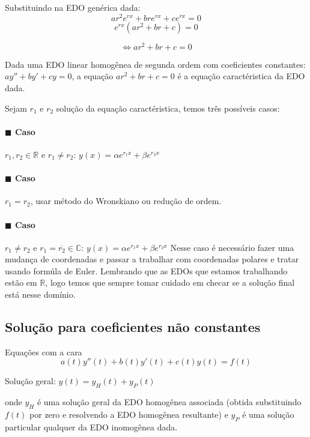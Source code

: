Substituindo na EDO genérica dada:
\[ a r^2 e^{rx} + b r e^{rx} + c e^{rx} = 0  \]
\[ e^{rx} \left( a r^2 + b r + c \right) = 0 \]

\[ \Leftrightarrow ar^2 + br + c = 0 \]


\begin{theorem}
  Dada uma EDO linear homogênea de segunda ordem com coeficientes constantes:
  $a y'' + b y' + cy = 0$, a equação \( a r^2 + br + c = 0 \) é a equação caractéristica
  da EDO dada.
\end{theorem}

Sejam \( r_1  \) e \( r_2 \) solução da equação caractéristica, temos três possíveis casos:

\paragraph{$\blacksquare$ Caso} \( r_1, r_2 \in \mathbb{R} \)  e \( r_1 \neq r_2 \): \( y(x) =  \alpha e^{r_1 x} + \beta e^{r_2 x}\) 
\paragraph{$\blacksquare$ Caso} \( r_1 = r_2 \), usar método do Wronskiano ou redução de ordem.
\paragraph{$\blacksquare$ Caso} \( r_1 \neq r_2 \)  e \( r_1 = \overline{r_2} \in \mathbb{C} \): \( y(x) = \alpha e^{r_1x} + \beta e^{r_2 x} \) 
  Nesse caso é necessário fazer uma mudança de coordenadas e passar a trabalhar com coordenadas
  polares e tratar usando formúla de Euler. Lembrando que as EDOs que estamos trabalhando estão em
  \( \mathbb{R} \), logo temos que sempre tomar cuidado em checar se a solução final está nesse domínio.

\subsection{Solução para coeficientes não constantes}
Equações com a cara 
\[ a(t) y''(t) + b(t) y'(t) + c(t) y(t) = f(t) \]

Solução geral: \( y(t) = y_{H} (t) + y_{P} (t) \) 

onde \( y_H \) é uma solução geral da EDO homogênea associada (obtida substituindo
$f(t)$ por zero e resolvendo a EDO homogênea resultante) e \( y_P \) é uma solução particular
qualquer da EDO inomogênea dada.

